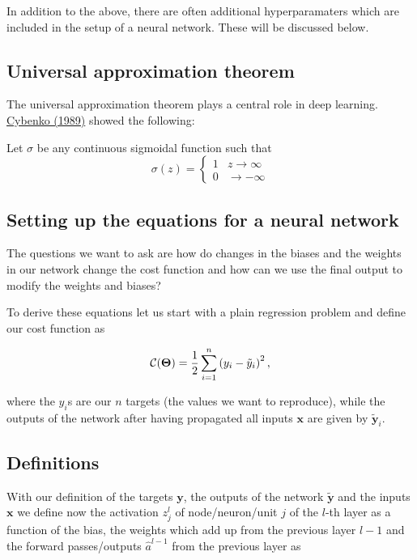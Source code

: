 \documentclass[%
oneside,                 %
final,                   %
10pt]{article}
\begin{document}
In addition to the above, there are often additional hyperparamaters
which are included in the setup of a neural network. These will be
discussed below.

\subsection{Universal approximation theorem}
The universal approximation theorem plays a central role in deep learning.
\href{{https://link.springer.com/article/10.1007/BF02551274}}{Cybenko (1989)} showed the following:
\begin{block}{}
Let $\sigma$ be any continuous sigmoidal function such that
\[
\sigma(z) = \left\{\begin{array}{cc} 1 & z\rightarrow \infty\\ 0 & \rightarrow -\infty \end{array}\right.
\]
\end{block}

\subsection{Setting up the equations for a neural network}

The questions we want to ask are how do changes in the biases and the
weights in our network change the cost function and how can we use the
final output to modify the weights and biases?

To derive these equations let us start with a plain regression problem
and define our cost function as

\[
{\cal C}(\bm{\Theta})  =  \frac{1}{2}\sum_{i=1}^n\left(y_i - \tilde{y}_i\right)^2, 
\]

where the $y_i$s are our $n$ targets (the values we want to
reproduce), while the outputs of the network after having propagated
all inputs $\bm{x}$ are given by $\bm{\tilde{y}}_i$.

\subsection{Definitions}

With our definition of the targets $\bm{y}$, the outputs of the
network $\bm{\tilde{y}}$ and the inputs $\bm{x}$ we
define now the activation $z_j^l$ of node/neuron/unit $j$ of the
$l$-th layer as a function of the bias, the weights which add up from
the previous layer $l-1$ and the forward passes/outputs
$\hat{a}^{l-1}$ from the previous layer as
\end{document}
